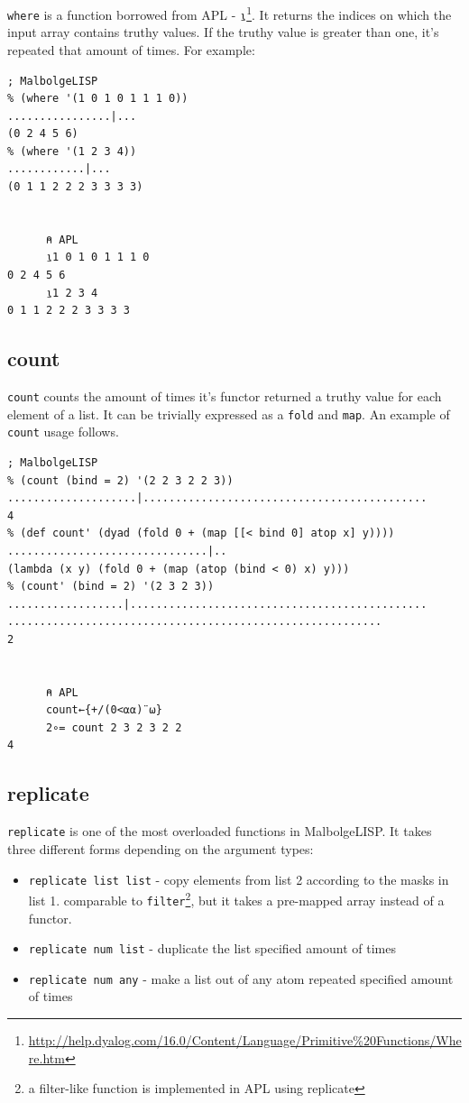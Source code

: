 \par \verb|where| is a function borrowed from APL - \verb|⍸|\footnote{\url{http://help.dyalog.com/16.0/Content/Language/Primitive\%20Functions/Where.htm}}. It returns the indices on which the input array contains truthy values. If the truthy value is greater than one, it's repeated that amount of times. For example:

\begin{verbatim}
; MalbolgeLISP
% (where '(1 0 1 0 1 1 1 0))
................|...
(0 2 4 5 6)
% (where '(1 2 3 4))
............|...
(0 1 1 2 2 2 3 3 3 3)


      ⍝ APL
      ⍸1 0 1 0 1 1 1 0
0 2 4 5 6
      ⍸1 2 3 4
0 1 1 2 2 2 3 3 3 3
\end{verbatim}

\subsection{count}

\par \verb|count| counts the amount of times it's functor returned a truthy value for each element of a list. It can be trivially expressed as a \verb|fold| and \verb|map|. An example of \verb|count| usage follows.

\begin{verbatim}
; MalbolgeLISP
% (count (bind = 2) '(2 2 3 2 2 3))
....................|............................................
4
% (def count' (dyad (fold 0 + (map [[< bind 0] atop x] y))))
...............................|..
(lambda (x y) (fold 0 + (map (atop (bind < 0) x) y)))
% (count' (bind = 2) '(2 3 2 3))
..................|..............................................
..........................................................
2


      ⍝ APL
      count←{+/(0<⍺⍺)¨⍵}
      2∘= count 2 3 2 3 2 2
4
\end{verbatim}

\subsection{replicate}

\par \verb|replicate| is one of the most overloaded functions in MalbolgeLISP. It takes three different forms depending on the argument types:
\begin{itemize}
    \item \verb|replicate list list| - copy elements from list 2 according to the masks in list 1. comparable to \verb|filter|\footnote{a filter-like function is implemented in APL using replicate}, but it takes a pre-mapped array instead of a functor.
    \item \verb|replicate num list| - duplicate the list specified amount of times
    \item \verb|replicate num any| - make a list out of any atom repeated specified amount of times
\end{itemize}

